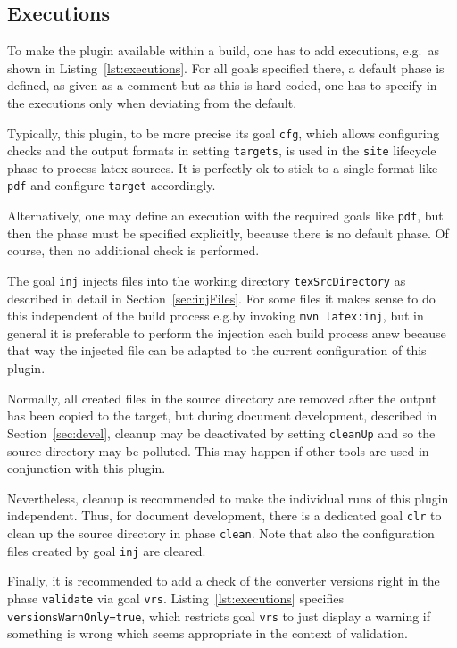 \subsection{Executions}\label{subsec:xmlPomExecutions}

To make the plugin available within a build,
one has to add executions, e.g.~as shown in Listing~\ref{lst:executions}. 
For all goals specified there, a default phase is defined, 
as given as a comment but as this is hard-coded, 
one has to specify in the executions only 
when deviating from the default. 

Typically, this plugin, to be more precise its goal \texttt{cfg}, 
which allows configuring checks and the output formats in setting \texttt{targets},  
is used in the \texttt{site} lifecycle phase 
to process latex sources. 
It is perfectly ok to stick to a single format like \texttt{pdf} 
and configure \texttt{target} accordingly. 

Alternatively, one may define an execution with the required goals like \texttt{pdf}, 
but then the phase must be specified explicitly, because there is no default phase. 
Of course, then no additional check is performed. 

The goal \texttt{inj} injects files into the working directory \texttt{texSrcDirectory} 
as described in detail in Section~\ref{sec:injFiles}. 
For some files it makes sense to do this independent of the build process 
e.g.\@ by invoking \texttt{mvn latex:inj}, 
but in general it is preferable to perform the injection each build process anew 
because that way the injected file can be adapted 
to the current configuration of this plugin. 

Normally, all created files in the source directory are removed 
after the output has been copied to the target, 
but during document development, described in Section~\ref{sec:devel}, 
cleanup may be deactivated by setting \texttt{cleanUp} 
and so the source directory may be polluted. 
This may happen if other tools are used in conjunction with this plugin. 

Nevertheless, cleanup is recommended to make the individual runs of this plugin independent.
Thus, for document development, there is a dedicated goal \texttt{clr} 
to clean up the source directory in phase \texttt{clean}. 
Note that also the configuration files created by goal \texttt{inj} are cleared. 

Finally, it is recommended to add a check of the converter versions
right in the phase \texttt{validate} via goal \texttt{vrs}.
Listing~\ref{lst:executions} specifies \texttt{versionsWarnOnly=true}, 
which restricts goal \texttt{vrs} to just display a warning 
if something is wrong 
which seems appropriate in the context of validation. 

